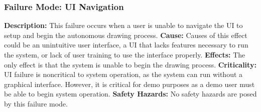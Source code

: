 \subsubsection{Failure Mode: UI Navigation}
\label{sec:ui_fm_navigation}
\textbf{Description:} This failure occurs when a user is unable to navigate the UI to setup and begin the autonomous drawing process.
\textbf{Cause:} Causes of this effect could be an unintuitive user interface, a UI that lacks features necessary to run the system, or lack of user training to use the interface properly.
\textbf{Effects:} The only effect is that the system is unable to begin the drawing process.
\textbf{Criticality:} UI failure is noncritical to system operation, as the system can run without a graphical interface. However, it is critical for demo purposes as a demo user must be able to begin system operation.
\textbf{Safety Hazards:} No safety hazards are posed by this failure mode.
